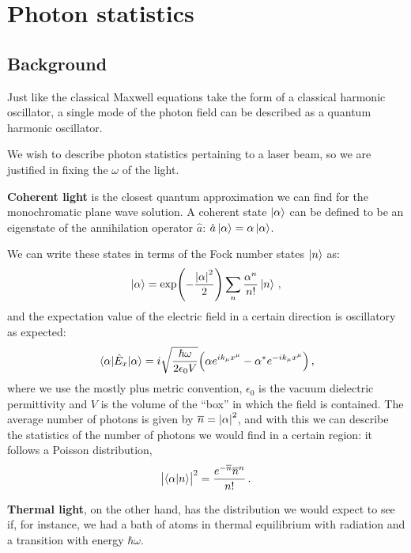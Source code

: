 \documentclass[main.tex]{subfiles}
\begin{document}
\section{Photon statistics}

\subsection{Background}

Just like the classical Maxwell equations take the form of a classical harmonic oscillator, a single mode of the photon field can be described as a quantum harmonic oscillator.

We wish to describe photon statistics pertaining to a laser beam, so we are justified in fixing the \(\omega \) of the light.

\textbf{Coherent light} is the closest quantum approximation we can find for the monochromatic plane wave solution. A coherent state \(\ket{\alpha } \) can be defined to be an eigenstate of the annihilation operator \(\hat{a}\): \(\hat{a} \ket{\alpha } = \alpha \ket{\alpha }\). 

We can write these states in terms of the Fock number states \(\ket{n}\) as: 
%
\begin{align}
\ket{\alpha } = \exp(- \frac{\abs{\alpha }^2}{2}) 
\sum _{n} \frac{\alpha^{n}}{n!} \ket{n}
\,,
\end{align}
%
and the expectation value of the electric field in a certain direction is oscillatory as expected: 
%
\begin{align}
\ev{\hat{E}_x}{\alpha } = i \sqrt{\frac{\hbar \omega }{ 2 \epsilon_0 V}} \qty( \alpha  e^{i k_\mu x^{\mu }} - \alpha^{*} e^{-i k_\mu x^{\mu }} )
\,,
\end{align}
%
where we use the mostly plus metric convention, \(\epsilon_0 \) is the vacuum dielectric permittivity and \(V\) is the volume of the ``box'' in which the field is contained. 
The average number of photons is given by \(\overline{n} = \abs{\alpha }^2\), and with this we can describe the statistics of the number of photons we would find in a certain region: it follows a Poisson distribution, 
%
\begin{align}
\abs{\braket{\alpha }{n}}^2 = \frac{e^{-\overline{n}} \overline{n}^{n}}{n!}
\,.
\end{align}

\textbf{Thermal light}, on the other hand, has the distribution we would expect to see if, for instance, we had a bath of atoms in thermal equilibrium with radiation and a transition with energy \(\hbar \omega \)\cite[section 14.4]{salehFundamentalsPhotonics}.
\end{document}
